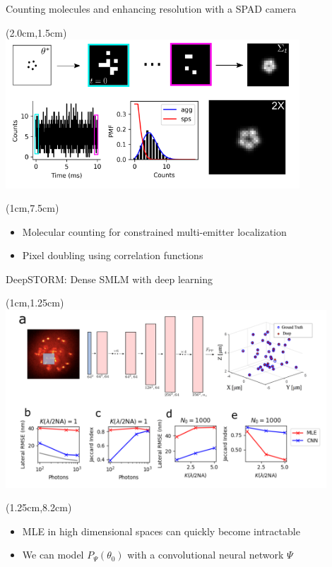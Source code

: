 \documentclass{beamer}					%
\begin{document}
\begin{frame}{Counting molecules and enhancing resolution with a SPAD camera}

\begin{textblock*}{11cm}(2.0cm,1.5cm)
\includegraphics[width=11cm]{DoubleFigure.png}
\end{textblock*}

\begin{textblock*}{11cm}(1cm,7.5cm)
\begin{itemize}
\item Molecular counting for constrained multi-emitter localization
\item Pixel doubling using correlation functions
\end{itemize}

\end{textblock*}


\end{frame}

\begin{frame}{DeepSTORM: Dense SMLM with deep learning}

\begin{textblock*}{12cm}(1cm,1.25cm)
\includegraphics[width=12cm]{PSF2D.png}
\end{textblock*}
\begin{textblock*}{12cm}(1.25cm,8.2cm)
\begin{itemize}
\item MLE in high dimensional spaces can quickly become intractable
\item We can model $P_{\Psi}(\theta_{0})$ with a convolutional neural network $\Psi$
\end{itemize}
\end{textblock*}

\end{frame}
\end{document}
